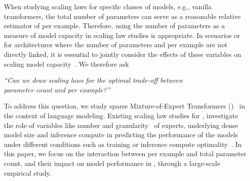 When studying scaling laws for specific classes of models, e.g., vanilla transformers, the total number of parameters can serve as a reasonable relative estimator of \flops per example. 
Therefore, using the number of parameters as a measure of model capacity in scaling law studies is appropriate. 
In scenarios or for architectures where the number of parameters and \flops per example are not directly linked, it is essential to jointly consider the effects of these variables on scaling model capacity~\citep{clark2022unified}.
We therefore ask
\begin{center}
\emph{``Can we draw scaling laws for the optimal trade-off between\\parameter count and \flops per example?''} 
\end{center}
To address this question, we study sparse Mixture-of-Expert Transformers (\moes)~\citep{shazeer2017,lepikhin2021gshard,fedus_switch,zoph2022st,muennighoff2024olmoe} in the context of language modeling.
Existing scaling law studies for \moes, investigate the role of variables like number and granularity~\citep{ludziejewski2024scaling} of experts, underlying dense model size and inference compute in predicting the performance of the models under different conditions such as training or inference compute optimality~\citep{Du2021GLaMES,clark2022unified,yun2024toward,ludziejewski2024scaling}. In this paper, we focus on the interaction between \flops per example and total parameter count, and their impact on model performance in \moes, through a large-scale empirical study. 

